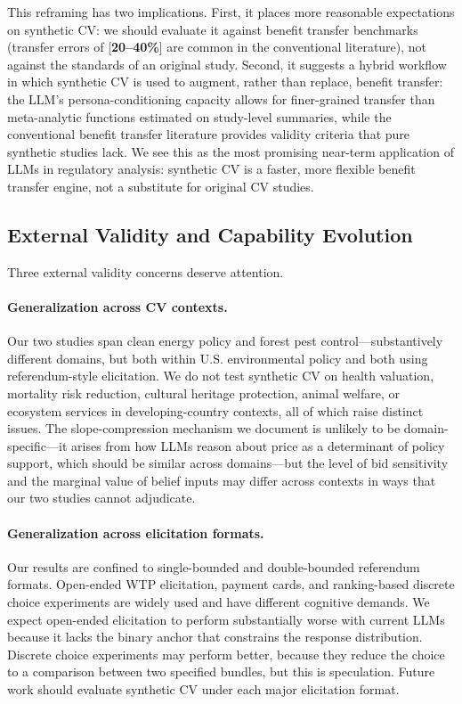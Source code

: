 \documentclass[12pt]{article}
\begin{document}
This reframing has two implications. First, it places more reasonable expectations on synthetic CV: we should evaluate it against benefit transfer benchmarks (transfer errors of [\textbf{20--40\%}] are common in the conventional literature), not against the standards of an original study. Second, it suggests a hybrid workflow in which synthetic CV is used to augment, rather than replace, benefit transfer: the LLM's persona-conditioning capacity allows for finer-grained transfer than meta-analytic functions estimated on study-level summaries, while the conventional benefit transfer literature provides validity criteria that pure synthetic studies lack. We see this as the most promising near-term application of LLMs in regulatory analysis: synthetic CV is a faster, more flexible benefit transfer engine, not a substitute for original CV studies.

\subsection{External Validity and Capability Evolution}\label{sec:disc-external-validity}

Three external validity concerns deserve attention.

\paragraph{Generalization across CV contexts.} Our two studies span clean energy policy and forest pest control---substantively different domains, but both within U.S. environmental policy and both using referendum-style elicitation. We do not test synthetic CV on health valuation, mortality risk reduction, cultural heritage protection, animal welfare, or ecosystem services in developing-country contexts, all of which raise distinct issues. The slope-compression mechanism we document is unlikely to be domain-specific---it arises from how LLMs reason about price as a determinant of policy support, which should be similar across domains---but the level of bid sensitivity and the marginal value of belief inputs may differ across contexts in ways that our two studies cannot adjudicate.

\paragraph{Generalization across elicitation formats.} Our results are confined to single-bounded and double-bounded referendum formats. Open-ended WTP elicitation, payment cards, and ranking-based discrete choice experiments are widely used and have different cognitive demands. We expect open-ended elicitation to perform substantially worse with current LLMs because it lacks the binary anchor that constrains the response distribution. Discrete choice experiments may perform better, because they reduce the choice to a comparison between two specified bundles, but this is speculation. Future work should evaluate synthetic CV under each major elicitation format.
\end{document}
